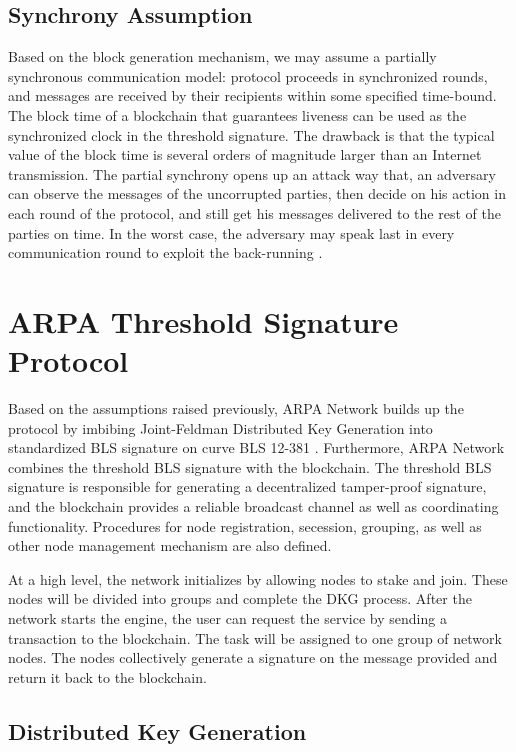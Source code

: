 \documentclass[11pt]{article}
\begin{document}
\subsection{Synchrony Assumption}

Based on the block generation mechanism, we may assume a partially synchronous communication model: protocol proceeds in synchronized rounds, and messages are received by their recipients within some specified time-bound. The block time of a blockchain that guarantees liveness can be used as the synchronized clock in the threshold signature. The drawback is that the typical value of the block time is several orders of magnitude larger than an Internet transmission. The partial synchrony opens up an attack way that, an adversary can observe the messages of the uncorrupted parties, then decide on his action in each round of the protocol, and still get his messages delivered to the rest of the parties on time. In the worst case, the adversary may speak last in every communication round to exploit the back-running \cite{gennaro2007secure}.

\section{ARPA Threshold Signature Protocol}

Based on the assumptions raised previously, ARPA Network builds up the protocol by imbibing Joint-Feldman Distributed Key Generation into standardized BLS signature \cite{irtf-cfrg-bls-signature-05} on curve BLS 12-381 \cite{sean2017bls}. Furthermore, ARPA Network combines the threshold BLS signature with the blockchain. The threshold BLS signature is responsible for generating a decentralized tamper-proof signature, and the blockchain provides a reliable broadcast channel as well as coordinating functionality. Procedures for node registration, secession, grouping, as well as other node management mechanism are also defined.

At a high level, the network initializes by allowing nodes to stake and join. These nodes will be divided into groups and complete the DKG process. After the network starts the engine, the user can request the service by sending a transaction to the blockchain. The task will be assigned to one group of network nodes. The nodes collectively generate a signature on the message provided and return it back to the blockchain.

\subsection{Distributed Key Generation}
\end{document}
